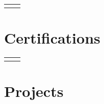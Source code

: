 \documentclass[11pt, letterpaper]{resume}
\begin{document}
\begin{paracol}{2}
\begin{supertabular}{rl}

\end{supertabular}


\section*{Certifications}
\begin{supertabular}{rl}


\end{supertabular}

\bigskip


\section*{Projects}









\end{paracol}
\end{document}
